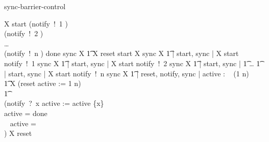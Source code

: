 \begin{pattern}{sync-barrier-control}
\begin{circusaction*}
  \circblockopen
    \circmu X \circspot start \then
    \circblockopen
      (notify~!~1 \then \Skip) ~ \interleave
      \\
      (notify~!~2 \then \Skip) ~ \interleave
      \\
      \dots
      \\
      (notify~!~n \then \Skip)
    \circblockclose
    \circseq done \then \Skip \circseq sync \then X
  \circblockclose
  \also
  \t1 \equiv
  \also
  \circblockopen
    \circblockopen
      \circblockopen
        \circmu X \circspot reset \then start \then X \circseq sync \then X
      \circblockclose
      \also
      \t1 \lpar \emptyset | \lchanset start, sync \rchanset | \emptyset \rpar
      \also
      \circblockopen
        \circmu X \circspot start \then notify~!~1 \then \Skip \circseq sync \then X
      \circblockclose
      \also
      \t1 \lpar \emptyset | \lchanset start, sync \rchanset | \emptyset \rpar
      \also
      \circblockopen
        \circmu X \circspot start \then notify~!~2 \then \Skip \circseq sync \then X
      \circblockclose
      \also
      \t1 \lpar \emptyset | \lchanset start, sync \rchanset | \emptyset \rpar
      \also
      \t1 \dots
      \also
      \t1 \lpar \emptyset | \lchanset start, sync \rchanset | \emptyset \rpar
      \also
      \circblockopen
        \circmu X \circspot start \then notify~!~n \then \Skip \circseq sync \then X
      \circblockclose
    \circblockclose
    \also
    \t1 \lpar \emptyset | \lchanset reset, notify, sync \rchanset | \emptyset \rpar
    \also
    \circblockopen
      \circvar active : \power ~ (1 \upto n) \circspot
      \\
      \t1 \circmu X \circspot
      \circblockopen
        (reset \then active := 1 \upto n)
        \\
        \t1 \extchoice
        \\
        (notify~?~x \then
        \circblockopen
          active := active \setdiff \{x\} \circseq
          \\
          \circif active = \emptyset \circthen done \then \Skip\\
          \circelse ~ \lnot active = \emptyset \circthen \Skip\\
          \circfi
        \circblockclose)
      \circblockclose
      \circseq X
    \circblockclose
  \circblockclose
  \circhide \lchanset reset \rchanset
\end{circusaction*}
\end{pattern}
